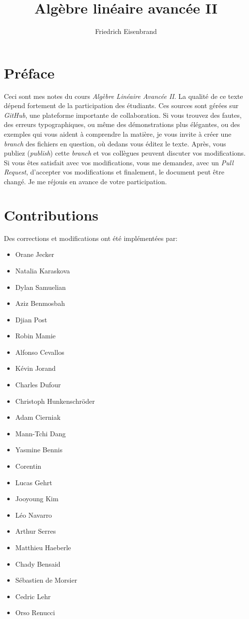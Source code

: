 \documentclass[a4paper,11pt,french]{scrbook}
\title{Algèbre linéaire avancée II}
\author{Friedrich Eisenbrand}
\theoremstyle{plain}
\theoremstyle{definition}
\begin{document}
\maketitle
  
\section*{Préface}
\noindent Ceci sont mes notes du cours \emph{Algèbre Linéaire Avancée II}.
La qualité de ce texte dépend fortement de la participation  des étudiants. 
Ces  sources sont gérées sur \emph{GitHub}, une plateforme importante de collaboration. Si vous trouvez des fautes, des erreurs typographiques, ou même des démonstrations plus élégantes, ou des exemples qui vous aident à comprendre la matière, je vous invite à créer une \emph{branch} des fichiers en question, où dedans vous éditez le texte. Après, vous publiez (\emph{publish}) cette \emph{branch} et vos collègues peuvent discuter vos modifications. Si vous êtes satisfait avec vos modifications, vous me demandez, avec un \emph{Pull Request}, d'accepter vos modifications et finalement, le document peut être changé. Je me réjouis en avance de votre participation. 

  
\section*{Contributions}

Des corrections et modifications ont été implémentées par: 
\begin{itemize}
\item Orane Jecker 
\item Natalia Karaskova
\item Dylan Samuelian
\item Aziz Benmosbah
\item Djian Post
\item Robin Mamie
\item Alfonso Cevallos
\item Kévin Jorand
\item Charles Dufour 
\item Christoph Hunkenschröder
\item Adam Cierniak
\item Mann-Tchi Dang
\item Yasmine Bennis
\item Corentin 
\item Lucas Gehrt
\item Jooyoung Kim 
\item Léo Navarro
\item Arthur Serres
\item Matthieu Haeberle
\item Chady Bensaid
\item Sébastien de Morsier 
\item Cedric Lehr
\item Orso Renucci
\end{itemize}
\end{document}
